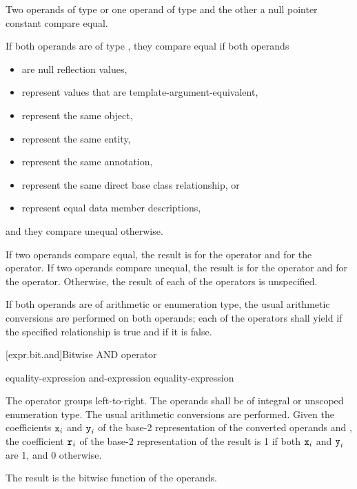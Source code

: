 \pnum
Two operands of type  or one operand of type
 and the other a null pointer constant compare equal.

\pnum
If both operands are of type ,
they compare equal if both operands
\begin{itemize}
\item are null reflection values,
\item represent values that are template-argument-equivalent,
\item represent the same object,
\item represent the same entity,
\item represent the same annotation,
\item represent the same direct base class relationship, or
\item represent equal data member descriptions,
\end{itemize}
and they compare unequal otherwise.

\pnum
If two operands compare equal, the result is  for
the \tcode{==} operator and  for the \tcode{!=} operator. If two operands
compare unequal, the result is  for the \tcode{==} operator and
 for the \tcode{!=} operator. Otherwise, the result of each of the
operators is unspecified.

\pnum
If both operands are of arithmetic or enumeration type, the usual arithmetic
conversions are performed on both operands; each of the operators shall yield
 if the specified relationship is true and  if it is
false.

[expr.bit.and]{Bitwise AND operator}%
%
%
%
%

\begin{bnf}
\br
    equality-expression\br
    and-expression \terminal{\&} equality-expression
\end{bnf}

\pnum
The \tcode{\&} operator groups left-to-right.
The operands shall be of integral or unscoped enumeration type.
The usual arithmetic conversions are performed.
Given the coefficients $\tcode{x}_i$ and $\tcode{y}_i$
of the base-2 representation
of the converted operands  and ,
the coefficient $\tcode{r}_i$
of the base-2 representation of the result 
is 1 if both $\tcode{x}_i$ and $\tcode{y}_i$ are 1, and 0 otherwise.
\begin{note}
The result is the bitwise  function of the operands.
\end{note}

